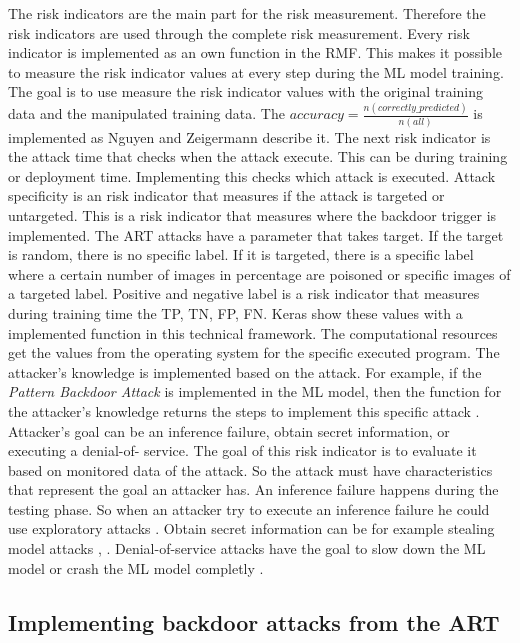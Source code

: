 The risk indicators are the main part for the risk measurement. Therefore the risk indicators are used through the complete risk measurement. Every risk indicator is implemented as an own
function in the RMF. This makes it possible to measure the risk indicator values at every step during the ML model training. The goal is to use measure the risk indicator values with the
original training data and the manipulated training data. The $accuracy=\frac{n(correctly\_predicted)}{n(all)}$ is implemented as Nguyen and Zeigermann \cite{9783960101925} describe it.
The next risk indicator is the attack time that checks when the attack execute. This can be during training or deployment time. Implementing this checks which attack is executed. Attack
specificity is an risk indicator that measures if the attack is targeted or untargeted. This is a risk indicator that measures where the backdoor trigger is implemented. The ART attacks
have a parameter that takes target. If the target is random, there is no specific label. If it is targeted, there is a specific label where a certain number of images in percentage are
poisoned or specific images of a targeted label. Positive and negative label is a risk indicator that measures during training time the TP, TN, FP, FN. Keras show these values with a
implemented function in this technical framework. The computational resources get the values from the operating system for the specific executed program. The attacker's knowledge is
implemented based on the attack. For example, if the \textit{Pattern Backdoor Attack} is implemented in the ML model, then the function for the attacker's knowledge returns the steps to
implement this specific attack \cite{bsi_2013}. Attacker's goal \cite{DBLP:journals/corr/abs-2012-04884} can be an inference failure, obtain secret information, or executing a denial-of-
service. The goal of this risk indicator is to evaluate it based on monitored data of the attack. So the attack must have characteristics that represent the goal an attacker has. An
inference failure happens during the testing phase. So when an attacker try to execute an inference failure he could use exploratory attacks \cite{tabassi2019taxonomy}. Obtain secret
information can be for example stealing model attacks \cite{DBLP:journals/corr/abs-2105-00623}, \cite{DBLP:journals/wicomm/ZhangLGQTZ20}. Denial-of-service attacks have the goal to slow
down the ML model or crash the ML model completly \cite{DBLP:journals/sensors/VaccariAC20}.

\subsection{Implementing backdoor attacks from the ART}

